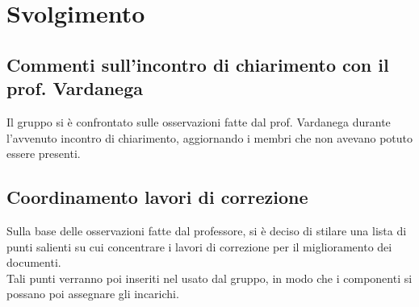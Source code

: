 \documentclass[]{article}
\begin{document}
	\newpage

	\section{Svolgimento}
		\subsection{Commenti sull'incontro di chiarimento con il prof. Vardanega}
		Il gruppo si è confrontato sulle osservazioni fatte dal prof. Vardanega durante l'avvenuto incontro di chiarimento, aggiornando i membri che non avevano potuto essere presenti. \\

		\subsection{Coordinamento lavori di correzione}
		Sulla base delle osservazioni fatte dal professore, si è deciso di stilare una lista di punti salienti su cui concentrare i lavori di correzione per il miglioramento dei documenti. \\
		Tali punti verranno poi inseriti nel  usato dal gruppo, in modo che i componenti si possano poi assegnare gli incarichi. \\ 
\end{document}
